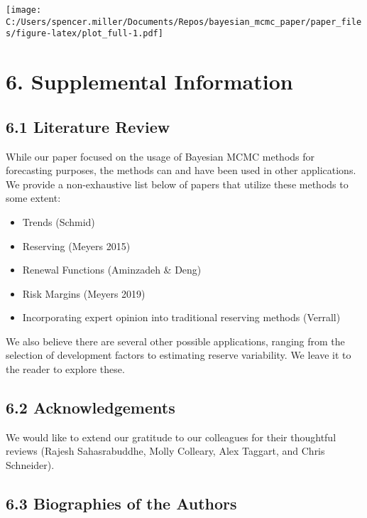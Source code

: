 \documentclass[
]{article}
\begin{document}
\texttt{[image: C:/Users/spencer.miller/Documents/Repos/bayesian\_mcmc\_paper/paper\_files/figure-latex/plot\_full-1.pdf]}

\hypertarget{supplemental-information}{%
\section{6. Supplemental Information}\label{supplemental-information}}

\hypertarget{literature-review}{%
\subsection{6.1 Literature Review}\label{literature-review}}

While our paper focused on the usage of Bayesian MCMC methods for
forecasting purposes, the methods can and have been used in other
applications. We provide a non-exhaustive list below of papers that
utilize these methods to some extent:

\begin{itemize}
\item
  Trends (Schmid)
\item
  Reserving (Meyers 2015)
\item
  Renewal Functions (Aminzadeh \& Deng)
\item
  Risk Margins (Meyers 2019)
\item
  Incorporating expert opinion into traditional reserving methods
  (Verrall)
\end{itemize}

We also believe there are several other possible applications, ranging
from the selection of development factors to estimating reserve
variability. We leave it to the reader to explore these.

\hypertarget{acknowledgements}{%
\subsection{6.2 Acknowledgements}\label{acknowledgements}}

We would like to extend our gratitude to our colleagues for their
thoughtful reviews (Rajesh Sahasrabuddhe, Molly Colleary, Alex Taggart,
and Chris Schneider).

\hypertarget{biographies-of-the-authors}{%
\subsection{6.3 Biographies of the
Authors}\label{biographies-of-the-authors}}
\end{document}
